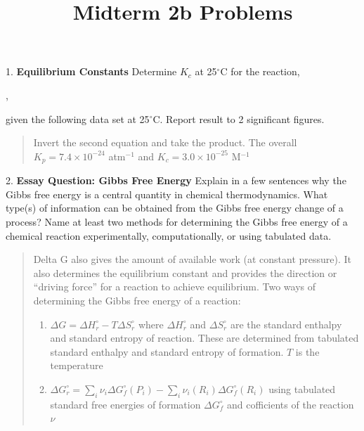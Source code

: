 \documentclass[11pt]{article}
\title{\textbf{Midterm 2b Problems}}
\newcommand{\brian}[1]{
  {\begin{quote}
      \color{blue} #1
  \end{quote}}
}
\begin{document}
\maketitle

1. \textbf{Equilibrium Constants} Determine $K_c$ at 25$^\circ$C
for the reaction,
\begin{center}
  ,
\end{center}
given the following data set at 25$^\circ$C. Report result to 2 significant figures.
\begin{center}


\end{center}

\brian{Invert the second equation and take the product. The overall $K_p = 7.4\times 10^{-24}$ atm$^{-1}$
  and $K_c = 3.0 \times 10^{-25}$ M$^{-1}$
  }

2. \textbf{Essay Question: Gibbs Free Energy} Explain in a few sentences why the Gibbs
free energy is a central quantity in chemical thermodynamics. What type(s) of information
can be obtained from the Gibbs free energy change of a process? Name at least two methods
for determining the Gibbs free energy of a chemical reaction experimentally, computationally,
or using tabulated data.

\brian{Delta G also gives the amount of available work (at constant pressure).
  It also determines the equilibrium constant and provides the direction or ``driving force''
  for a reaction to achieve equilibrium. Two ways of determining the Gibbs free energy of a reaction:
  \begin{enumerate}
  \item $\Delta G = \Delta H^\circ_r - T\Delta S^\circ_r$ where $\Delta H^\circ_r$ and $\Delta S^\circ_r$
    are the standard enthalpy and standard entropy of reaction. These are determined from tabulated
    standard enthalpy and standard entropy of formation. $T$ is the temperature
  \item $\Delta G^\circ_r = \sum_i \nu_i\Delta G^\circ_f(P_i)-\sum_i\nu_i(R_i)\Delta G^\circ_f(R_i)$
    using tabulated standard free energies of formation $\Delta G^\circ_f$ and cofficients of the reaction
    $\nu$
  \end{enumerate}
}
\end{document}
